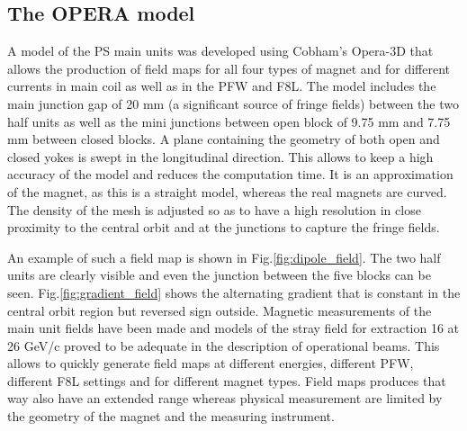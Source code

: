 \documentclass[a4paper,
               biblatex,     %
               keeplastbox,   %
               ]{jacow}
\begin{document}
\subsection{The OPERA model}
A model of the PS main units was developed using Cobham's Opera-3D that allows the production of field maps for all four types of magnet and for different currents in main coil as well as in the PFW and F8L. The model includes the main junction gap of 20 mm (a significant source of fringe fields) between the two half units as well as the mini junctions between open block of 9.75 mm and 7.75 mm between closed blocks. A plane containing the geometry of both open and closed yokes is swept in the longitudinal direction. This allows to keep a high accuracy of the model and reduces the computation time. It is an approximation of the magnet, as this is a straight model, whereas the real magnets are curved. The density of the mesh is adjusted so as to have a high resolution in close proximity to the central orbit and at the junctions to capture the fringe fields. \cite{anglada_reference_2019}

An example of such a field map is shown in Fig.\ref{fig:dipole_field}. The two half units are clearly visible and even the junction between the five blocks can be seen. Fig.\ref{fig:gradient_field} shows the alternating gradient that is constant in the central orbit region but reversed sign outside. Magnetic measurements of the main unit fields have been made \cite{manglunki_beam_1997} and models of the stray field for extraction 16 at 26 GeV/c proved to be adequate in the description of operational beams. This allows to quickly generate field maps at different energies, different PFW, different F8L settings and for different magnet types. Field maps produces that way also have an extended range whereas physical measurement are limited by the geometry of the magnet and the measuring instrument.
\end{document}
